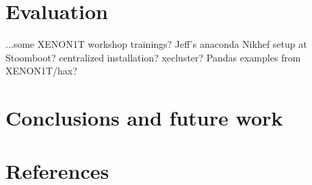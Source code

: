\documentclass[a4paper]{jpconf}
\begin{document}
\section{Evaluation}
...some XENON1T workshop trainings?
Jeff's anaconda Nikhef setup at Stoomboot? centralized installation? xecluster?
Pandas examples from XENON1T/hax?


\section{Conclusions and future work}
\lipsum[1-2]

\section*{References}


\end{document}
